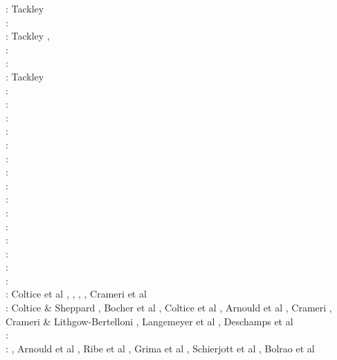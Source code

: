 \begin{itemize}
\begin{scriptsize}
\nineteenninetyfour: Tackley \cite{tackley94}\\
\nineteenninetyfive: \cite{scta95}\\
\nineteenninetysix: Tackley \cite{tack96}, \cite{tack96b}\\
\nineteenninetyeight: \cite{most98}\cite{thta98}\\
\twothousand: \cite{tack00}\cite{tack00b}\cite{tack00c}\cite{tack00d}\\
\twothousandone: Tackley \cite{tack01}\\
\twothousandtwo: \cite{falt02}\cite{tack02}\cite{taxi02}\\
\twothousandthree: \cite{taxi03}\\
\twothousandfour: \cite{xita04b}\cite{xita04}\cite{nata04}\cite{nata04b}\cite{nata04c}\cite{scmo04}\cite{yoog04}\\
\twothousandfive: \cite{grlt05}\cite{fasa05}\cite{nata05}\cite{nata05b}\cite{nabu05}\cite{yoog05}\\
\twothousandsix: \cite{mita06}\\
\twothousandseven: \cite{grlt07}\cite{grlt07b}\cite{heta07}\cite{tanh07}\\
\twothousandeight: \cite{deta08}\cite{hets08}\cite{heta08}\cite{sata08}\cite{nata08}\cite{tack08}\cite{vata08}\\
\twothousandnine: \cite{deta09}\cite{natd09}\cite{keta09}\\
\twothousandten: \cite{detn10}\cite{nata10}\cite{moht10}\cite{sate10}\cite{natd10}\\
\twothousandeleven: \cite{rota11}\cite{gokg11}\cite{nata11}\\
\twothousandtwelve: \cite{roct12}\cite{crtm12}\cite{cosr13}\cite{deyt12}\cite{dect12}\cite{arta12}\cite{natd12}
      \cite{ullc12}\\
\twothousandthirteen: \cite{ruts13}\cite{taab13}\cite{nata13}\cite{mowe13}\\
\twothousandfourteen: \cite{yadl14}\cite{crta14}\cite{roct14}\cite{cort14}\cite{becr14}\cite{lidt14}\cite{robg14}
      \cite{nata14}\\
\twothousandfifteen: \cite{bect15}\cite{delt15}\cite{lidt15}\cite{nani15}\\
\twothousandsixteen: \cite{sisc16}\cite{crta16}\\
\twothousandseventeen: Coltice et al \cite{cogu17}, \cite{pest17}, \cite{bahh17}, \cite{pact17}, 
Crameri et al \cite{crlt17}\\
\twothousandeighteen: Coltice \& Sheppard \cite{cosh18}, Bocher et al \cite{bofc18}, Coltice et al \cite{cold18}, Arnould et al \cite{arcf18}, Crameri \cite{cram18}, Crameri \& Lithgow-Bertelloni \cite{crli18}, Langemeyer et al \cite{lalt18}, Deschamps et al \cite{dert18}\\
\twothousandnineteen: \cite{gult19}\cite{argc19}\cite{deli19}\cite{pact19}\cite{cohf19}\cite{crcm19}\cite{ulcw19}\\
\twothousandtwenty: \cite{lalt20}\cite{gugb20}\cite{yabt20}, Arnould et al \cite{arcf20}, Ribe et al \cite{rits20}, Grima et al \cite{grlc20}, Schierjott et al \cite{scrt20}, Bolrao et al \cite{bobm20}
\end{scriptsize}


\end{itemize}

